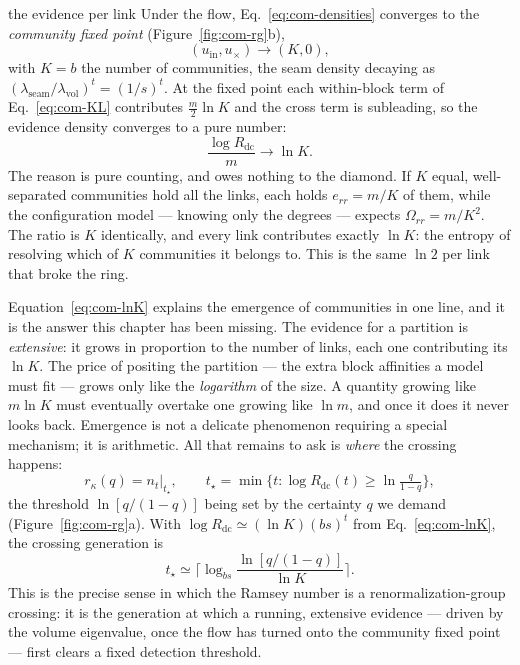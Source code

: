 \begin{calculation}{the evidence per link}
Under the flow, Eq.~\eqref{eq:com-densities} converges to the \emph{community
fixed point} (Figure~\ref{fig:com-rg}b),
\begin{equation}
  (u_{\mathrm{in}}, u_{\times}) \longrightarrow (K, 0),
  \label{eq:com-fixed}
\end{equation}
with $K=b$ the number of communities, the seam density decaying as
$(\lambda_{\mathrm{seam}}/\lambda_{\mathrm{vol}})^t=(1/s)^t$. At the fixed point
each within-block term of Eq.~\eqref{eq:com-KL} contributes $\tfrac{m}{2}\ln K$
and the cross term is subleading, so the evidence density converges to a pure
number:
\begin{equation}
  \frac{\log R_{\mathrm{dc}}}{m} \longrightarrow \ln K .
  \label{eq:com-lnK}
\end{equation}
The reason is pure counting, and owes nothing to the diamond. If $K$ equal,
well-separated communities hold all the links, each holds $e_{rr}=m/K$ of them,
while the configuration model --- knowing only the degrees --- expects
$\Omega_{rr}=m/K^2$. The ratio is $K$ identically, and every link contributes
exactly $\ln K$: the entropy of resolving which of $K$ communities it belongs to.
This is the same $\ln 2$ per link that broke the ring.
\end{calculation}

Equation~\eqref{eq:com-lnK} explains the emergence of communities in one line, and
it is the answer this chapter has been missing. The evidence for a partition is
\emph{extensive}: it grows in proportion to the number of links, each one
contributing its $\ln K$. The price of positing the partition --- the extra block
affinities a model must fit --- grows only like the \emph{logarithm} of the size. A
quantity growing like $m\ln K$ must eventually overtake one growing like $\ln m$,
and once it does it never looks back. Emergence is not a delicate phenomenon
requiring a special mechanism; it is arithmetic. All that remains to ask is
\emph{where} the crossing happens:
\begin{equation}
  r_\kappa(q) = n_t\big|_{t_\star}, \qquad
  t_\star = \min\Big\{t : \log R_{\mathrm{dc}}(t) \ge \ln\tfrac{q}{1-q}\Big\},
  \label{eq:com-cross}
\end{equation}
the threshold $\ln[q/(1-q)]$ being set by the certainty $q$ we demand
(Figure~\ref{fig:com-rg}a). With $\log R_{\mathrm{dc}}\simeq(\ln K)(bs)^t$ from
Eq.~\eqref{eq:com-lnK}, the crossing generation is
\begin{equation}
  t_\star \simeq \Big\lceil \log_{bs}\frac{\ln[q/(1-q)]}{\ln K} \Big\rceil .
  \label{eq:com-tstar}
\end{equation}
This is the precise sense in which the Ramsey number is a
re\-nor\-mal\-iza\-tion-group
crossing: it is the generation at which a running, extensive evidence --- driven by
the volume eigenvalue, once the flow has turned onto the community fixed point ---
first clears a fixed detection threshold.

